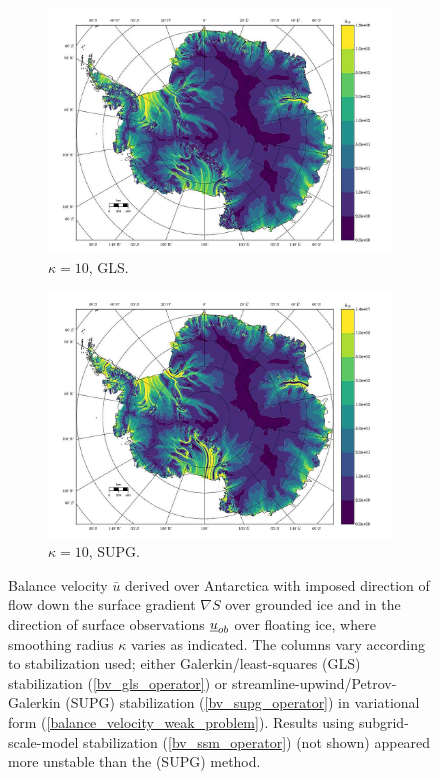 \begin{figure}
  \begin{subfigure}[b]{0.45\linewidth}
    \includegraphics[width=\linewidth]{images/balance_velocity/antarctica/d_U_ob_S/Ubar_10H_kappa_10_GLS.jpg}
  \caption{$\kappa = 10$, GLS.}
  \label{antarctica_bv_image_kappa_5_GLS_U_ob_S}
  \end{subfigure}
  \begin{subfigure}[b]{0.45\linewidth}
    \includegraphics[width=\linewidth]{images/balance_velocity/antarctica/d_U_ob_S/Ubar_10H_kappa_10_SUPG.jpg}
  \caption{$\kappa = 10$, SUPG.}
  \label{antarctica_bv_image_kappa_5_SUPG_U_ob_S}
  \end{subfigure}
  
  \caption[Antarctica balance-velocity with $\mathbf{d}^{\text{data}} = \mathbf{u}_{ob}$ over shelves.]{Balance velocity $\bar{u}$ derived over Antarctica with imposed direction of flow down the surface gradient $\nabla S$ over grounded ice and in the direction of surface observations $\underline{u}_{ob}$ over floating ice, where smoothing radius $\kappa$ varies as indicated.  The columns vary according to stabilization used; either Galerkin/least-squares (GLS) stabilization (\ref{bv_gls_operator}) or streamline-upwind/Petrov-Galerkin (SUPG) stabilization (\ref{bv_supg_operator}) in variational form (\ref{balance_velocity_weak_problem}).  Results using subgrid-scale-model stabilization (\ref{bv_ssm_operator}) (not shown) appeared more unstable than the (SUPG) method. \newline}


\end{figure}
